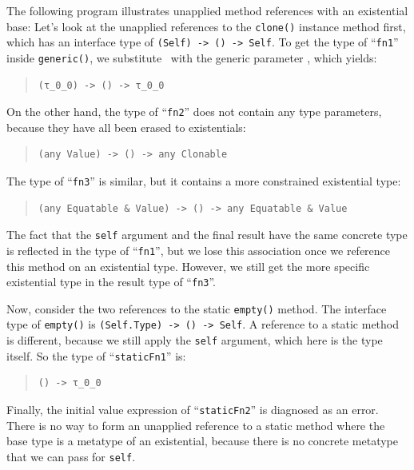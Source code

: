 \documentclass[../generics]{subfiles}
\begin{document}
\begin{example}
The following program illustrates unapplied method references with an existential base:
Let's look at the unapplied references to the \texttt{clone()} instance method first, which has an interface type of \texttt{(Self) -> () -> Self}. To get the type of ``\texttt{fn1}'' inside \texttt{generic()}, we substitute \tSelf\ with the generic parameter \rT, which yields:
\begin{quote}
\begin{verbatim}
(τ_0_0) -> () -> τ_0_0
\end{verbatim}
\end{quote}
On the other hand, the type of ``\texttt{fn2}'' does not contain any type parameters, because they have all been erased to existentials:
\begin{quote}
\begin{verbatim}
(any Value) -> () -> any Clonable
\end{verbatim}
\end{quote}
The type of ``\texttt{fn3}'' is similar, but it contains a more constrained existential type:
\begin{quote}
\begin{verbatim}
(any Equatable & Value) -> () -> any Equatable & Value
\end{verbatim}
\end{quote}
The fact that the \texttt{self} argument and the final result have the same concrete type is reflected in the type of ``\texttt{fn1}'', but we lose this association once we reference this method on an existential type. However, we still get the more specific existential type in the result type of ``\texttt{fn3}''.

Now, consider the two references to the static \texttt{empty()} method. The interface type of \texttt{empty()} is \texttt{(Self.Type) -> () -> Self}. A reference to a static method is different, because we still apply the \texttt{self} argument, which here is the type itself. So the type of ``\texttt{staticFn1}'' is:
\begin{quote}
\begin{verbatim}
() -> τ_0_0
\end{verbatim}
\end{quote}
Finally, the initial value expression of ``\texttt{staticFn2}'' is diagnosed as an error. There is no way to form an unapplied reference to a static method where the base type is a metatype of an existential, because there is no concrete metatype that we can pass for \texttt{self}.
\end{example}
\end{document}
